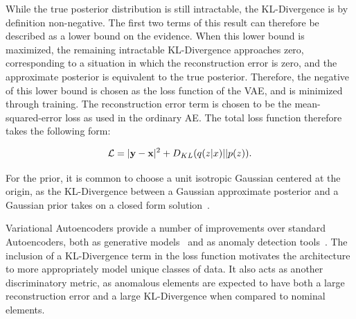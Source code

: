 \documentclass[12pt, a4paper]{article}
\begin{document}
While the true posterior distribution is still intractable, the KL-Divergence is by definition non-negative. The first two terms of this result can therefore be described as a lower bound on the evidence. 
When this lower bound is maximized, the remaining intractable KL-Divergence approaches zero, corresponding to a situation in which the reconstruction error is zero, and the approximate posterior is equivalent to the true posterior. 
Therefore, the negative of this lower bound is chosen as the loss function of the VAE, and is minimized through training. 
The reconstruction error term is chosen to be the mean-squared-error loss as used in the ordinary AE. 
The total loss function therefore takes the following form: 

\begin{equation}
	\mathcal{L} = |{\textbf y} - {\textbf x}|^{2} + D_{KL}(q(z|x)||p(z)).
\end{equation} 


For the prior, it is common to choose a unit isotropic Gaussian centered at the origin, as the KL-Divergence between a Gaussian approximate posterior and a Gaussian prior takes on a closed form solution~\cite{Goodfellow-et-al-2016}.



Variational Autoencoders provide a number of improvements over standard Autoencoders, both as generative models~\cite{kingma2014autoencoding} and as anomaly detection tools~\cite{An2015VariationalAB}. The inclusion of a KL-Divergence term in the loss function motivates the architecture to more appropriately model unique classes of data. It also acts as another discriminatory metric, as anomalous elements are expected to have both a large reconstruction error and a large KL-Divergence when compared to nominal elements.
\end{document}
